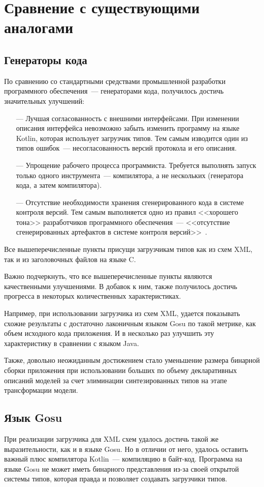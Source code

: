 \section{Сравнение с существующими аналогами}

\subsection{Генераторы кода}\label{res:generators}
По сравнению со стандартными средствами промышленной разработки программного обеспечения~--- генераторами кода,
получилось достичь значительных улучшений:
\begin{itemize}
	\item[---] Лучшая согласованность с внешними интерфейсами. При изменении описания интерфейса невозможно забыть изменить программу на языке Kotlin, которая использует загрузчик типов. Тем самым изводится один из типов ошибок~--- несогласованность версий протокола и его описания.
	\item[---] Упрощение рабочего процесса программиста. Требуется выполнять запуск только одного инструмента~--- компилятора, а не нескольких (генератора кода, а затем компилятора).
	\item[---] Отсутствие необходимости хранения сгенерированного кода в системе контроля версий. Тем самым выполняется одно из правил <<хорошего тона>> разработчиков программного обеспечения~--- <<отсутствие сгенерированных артефактов в системе контроля версий>>~\cite{art-of-agile}.
\end{itemize}

Все вышеперечисленные пункты присущи загрузчикам типов как из схем XML, так и из заголовочных файлов на языке C.

Важно подчеркнуть, что все вышеперечисленные пункты являются качественными улучшениями. В добавок к ним, также получилось достичь прогресса в некоторых количественных характеристиках.

Например, при использовании загрузчика из схем XML, удается показывать схожие результаты с достаточно лаконичным языком Gosu по такой метрике, как объем исходного кода приложения.
И в несколько раз улучшить эту характеристику в сравнении с языком Java.

Также, довольно неожиданным достижением стало уменьшение размера бинарной сборки приложения при использовании больших по объему декларативных описаний моделей за счет элиминации синтезированных типов на этапе трансформации модели.

\subsection{Язык Gosu}\label{xml-gosu-result}
При реализации загрузчика для XML схем удалось достичь такой же выразительности, как и в языке Gosu.
Но в отличии от него, удалось оставить важный плюс компилятора Kotlin~--- компиляцию в байт-код.
Программа на языке Gosu не может иметь бинарного представления из-за своей открытой системы типов,
которая правда и позволяет создавать загрузчики типов.

